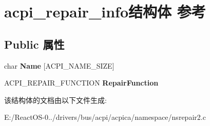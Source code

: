 \hypertarget{structacpi__repair__info}{}\section{acpi\+\_\+repair\+\_\+info结构体 参考}
\label{structacpi__repair__info}
\subsection*{Public 属性}
\begin{DoxyCompactItemize}
\item 
\mbox{\label{structacpi__repair__info_ae6f9127871387d9d5df139378888b6b3}} 
char {\bfseries Name} \mbox{[}A\+C\+P\+I\+\_\+\+N\+A\+M\+E\+\_\+\+S\+I\+ZE\mbox{]}
\item 
\mbox{\label{structacpi__repair__info_a15c81d7cd425f65129786ddfa3d10ba3}} 
A\+C\+P\+I\+\_\+\+R\+E\+P\+A\+I\+R\+\_\+\+F\+U\+N\+C\+T\+I\+ON {\bfseries Repair\+Function}
\end{DoxyCompactItemize}


该结构体的文档由以下文件生成\+:\begin{DoxyCompactItemize}
\item 
E\+:/\+React\+O\+S-\/0../drivers/bus/acpi/acpica/namespace/nsrepair2.\+c\end{DoxyCompactItemize}
